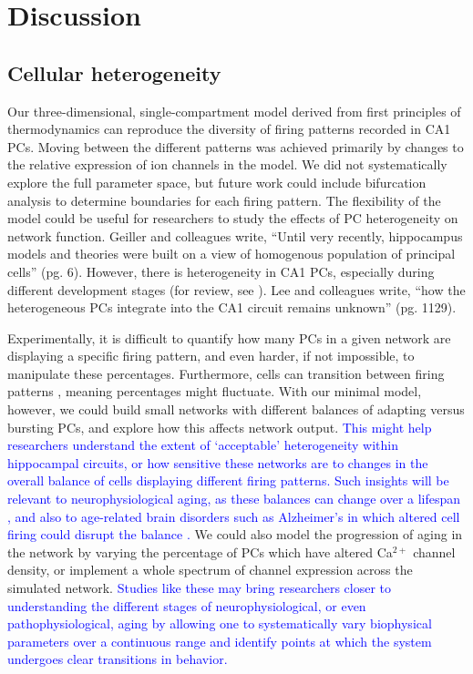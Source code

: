 \documentclass[10pt,letterpaper]{article}
\newcommand{\Ca}{Ca$^{2+}$}
\newcommand{\edit}[1]{\textcolor{blue}{#1}}
\begin{document}
\section*{Discussion}

\subsection*{Cellular heterogeneity}

Our three-dimensional, single-compartment model derived from first principles of thermodynamics can reproduce the diversity of firing patterns recorded in CA1 PCs. Moving between the different patterns was achieved primarily by changes to the relative expression of ion channels in the model. We did not systematically explore the full parameter space, but future work could include bifurcation analysis to determine boundaries for each firing pattern. The flexibility of the model could be useful for researchers to study the effects of PC heterogeneity on network function. Geiller and colleagues \cite{geiller2017segregated} write, ``Until very recently, hippocampus models and theories were built on a view of homogenous population of principal cells'' (pg. 6). However, there is heterogeneity in CA1 PCs, especially during different development stages (for review, see \cite{mckiernan2017ca1}). Lee and colleagues \cite{lee2014parvalbumin} write, ``how the heterogeneous PCs integrate into the CA1 circuit remains unknown'' (pg. 1129). 

Experimentally, it is difficult to quantify how many PCs in a given network are displaying a specific firing pattern, and even harder, if not impossible, to manipulate these percentages. Furthermore, cells can transition between firing patterns \cite{steriade1998dynamic}, meaning percentages might fluctuate. With our minimal model, however, we could build small networks with different balances of adapting versus bursting PCs, and explore how this affects network output. \edit{This might help researchers understand the extent of `acceptable' heterogeneity within hippocampal circuits, or how sensitive these networks are to changes in the overall balance of cells displaying different firing patterns. Such insights will be relevant to neurophysiological aging, as these balances can change over a lifespan \cite{chen2005transitional}, and also to age-related brain disorders such as Alzheimer's in which altered cell firing could disrupt the balance \cite{frere2018alzheimer}.} We could also model the progression of aging in the network by varying the percentage of PCs which have altered {\Ca} channel density, or implement a whole spectrum of channel expression across the simulated network. \edit{Studies like these may bring researchers closer to understanding the different stages of neurophysiological, or even pathophysiological, aging by allowing one to systematically vary biophysical parameters over a continuous range and identify points at which the system undergoes clear transitions in behavior.}
\end{document}
